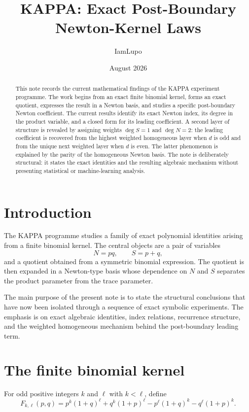 \documentclass[11pt,a4paper]{article}
\title{\textbf{KAPPA: Exact Post-Boundary Newton-Kernel Laws}}\author{IamLupo}\date{August 2026}
\begin{document}
\maketitle

\begin{abstract}
This note records the current mathematical findings of the KAPPA experiment programme. The work begins from an exact finite binomial kernel, forms an exact quotient, expresses the result in a Newton basis, and studies a specific post-boundary Newton coefficient. The current results identify its exact Newton index, its degree in the product variable, and a closed form for its leading coefficient. A second layer of structure is revealed by assigning weights $\deg S=1$ and $\deg N=2$: the leading coefficient is recovered from the highest weighted homogeneous layer when $d$ is odd and from the unique next weighted layer when $d$ is even. The latter phenomenon is explained by the parity of the homogeneous Newton basis. The note is deliberately structural: it states the exact identities and the resulting algebraic mechanism without presenting statistical or machine-learning analysis.
\end{abstract}

\section{Introduction}

The KAPPA programme studies a family of exact polynomial identities arising from a finite binomial kernel. The central objects are a pair of variables
\[
N=pq,\qquad S=p+q,
\]
and a quotient obtained from a symmetric binomial expression. The quotient is then expanded in a Newton-type basis whose dependence on $N$ and $S$ separates the product parameter from the trace parameter.

The main purpose of the present note is to state the structural conclusions that have now been isolated through a sequence of exact symbolic experiments. The emphasis is on exact algebraic identities, index relations, recurrence structure, and the weighted homogeneous mechanism behind the post-boundary leading term.

\section{The finite binomial kernel}

For odd positive integers $k$ and $\ell$ with $k<\ell$, define
\begin{equation}
F_{k,\ell}(p,q)
=
 p^k(1+q)^\ell
+q^k(1+p)^\ell
-p^\ell(1+q)^k
-q^\ell(1+p)^k.
\end{equation}
\end{document}
